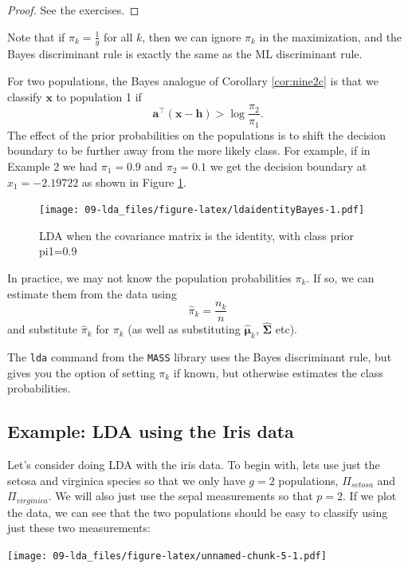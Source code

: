 \documentclass[
]{book}
\theoremstyle{definition}
\theoremstyle{definition}
\theoremstyle{definition}
\theoremstyle{definition}
\theoremstyle{remark}
\begin{document}
\begin{proof}
See the exercises.
\end{proof}

Note that if \(\pi_k=\frac{1}{g}\) for all \(k\), then we can ignore \(\pi_k\) in the maximization, and the Bayes discriminant rule is exactly the same as the ML discriminant rule.

For two populations, the Bayes analogue of Corollary \ref{cor:nine2c} is that we classify \(\mathbf x\) to population 1 if
\[\mathbf a^\top(\mathbf x-\mathbf h)> \log\frac{\pi_2}{\pi_1}.\]
The effect of the prior probabilities on the populations is to shift the decision boundary to be further away from the more likely class. For example, if in Example 2 we had \(\pi_1 = 0.9\) and \(\pi_2=0.1\) we get the decision boundary at \(x_1 = -2.19722\) as shown in Figure \ref{fig:ldaidentityBayes}.

\begin{figure}
\centering
\texttt{[image: 09-lda\_files/figure-latex/ldaidentityBayes-1.pdf]}
\caption{\label{fig:ldaidentityBayes}LDA when the covariance matrix is the identity, with class prior pi1=0.9}
\end{figure}

In practice, we may not know the population probabilities \(\pi_k\). If so, we can estimate them from the data using
\[\hat{\pi}_k = \frac{n_k}{n}\]
and substitute \(\hat{\pi}_k\) for \(\pi_k\) (as well as substituting \(\hat{{\boldsymbol{\mu}}}_k\), \(\widehat{\boldsymbol{\Sigma}}\) etc).

The \texttt{lda} command from the \texttt{MASS} library uses the Bayes discriminant rule, but gives you the option of setting \(\pi_k\) if known, but otherwise estimates the class probabilities.

\hypertarget{example-lda-using-the-iris-data}{%
\subsection{Example: LDA using the Iris data}\label{example-lda-using-the-iris-data}}

Let's consider doing LDA with the iris data. To begin with, lets use just the setosa and virginica species so that we only have \(g=2\) populations, \(\Pi_{setosa}\) and \(\Pi_{virginica}\). We will also just use the sepal measurements so that \(p=2\). If we plot the data, we can see that the two populations should be easy to classify using just these two measurements:

\texttt{[image: 09-lda\_files/figure-latex/unnamed-chunk-5-1.pdf]}
\end{document}
